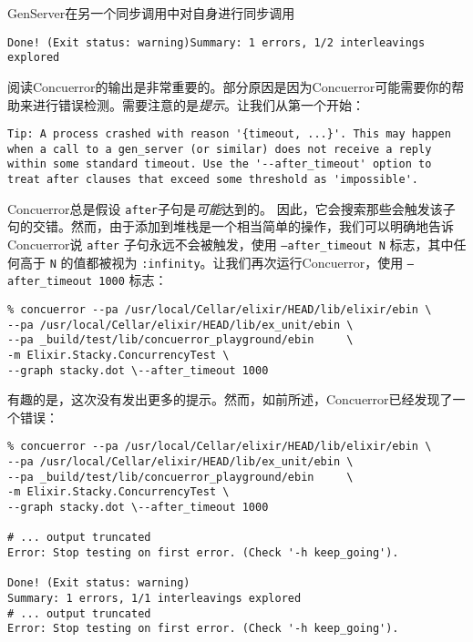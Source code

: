 \begin{example}{GenServer在另一个同步调用中对自身进行同步调用}
\begin{code}{}
\begin{verbatim}
Done! (Exit status: warning)Summary: 1 errors, 1/2 interleavings explored
\end{verbatim}
\end{code}

阅读Concuerror的输出是非常重要的。部分原因是因为Concuerror可能需要你的帮助来进行错误检测。需要注意的是\emph{提示}。让我们从第一个开始：

\begin{code}{}
\begin{verbatim}
Tip: A process crashed with reason '{timeout, ...}'. This may happen when a call to a gen_server (or similar) does not receive a reply within some standard timeout. Use the '--after_timeout' option to treat after clauses that exceed some threshold as 'impossible'.
\end{verbatim}
\end{code}

Concuerror总是假设 \texttt{after}子句是\emph{可能}达到的。
因此，它会搜索那些会触发该子句的交错。然而，由于添加到堆栈是一个相当简单的操作，我们可以明确地告诉Concuerror说
\texttt{after} 子句永远不会被触发，使用
\texttt{--after\_timeout N} 标志，其中任何高于
\texttt{N} 的值都被视为
\texttt{:infinity}。让我们再次运行Concuerror，使用
\texttt{--after\_timeout 1000} 标志：

\begin{code}{}
\begin{verbatim}
% concuerror --pa /usr/local/Cellar/elixir/HEAD/lib/elixir/ebin \
--pa /usr/local/Cellar/elixir/HEAD/lib/ex_unit/ebin \
--pa _build/test/lib/concuerror_playground/ebin     \
-m Elixir.Stacky.ConcurrencyTest \
--graph stacky.dot \--after_timeout 1000
\end{verbatim}
\end{code}

有趣的是，这次没有发出更多的提示。然而，如前所述，Concuerror已经发现了一个错误：

\begin{code}{}
\begin{verbatim}
% concuerror --pa /usr/local/Cellar/elixir/HEAD/lib/elixir/ebin \
--pa /usr/local/Cellar/elixir/HEAD/lib/ex_unit/ebin \
--pa _build/test/lib/concuerror_playground/ebin     \
-m Elixir.Stacky.ConcurrencyTest \
--graph stacky.dot \--after_timeout 1000

# ... output truncated
Error: Stop testing on first error. (Check '-h keep_going').

Done! (Exit status: warning)
Summary: 1 errors, 1/1 interleavings explored
# ... output truncated
Error: Stop testing on first error. (Check '-h keep_going').


\end{verbatim}
\end{code}
\end{example}
